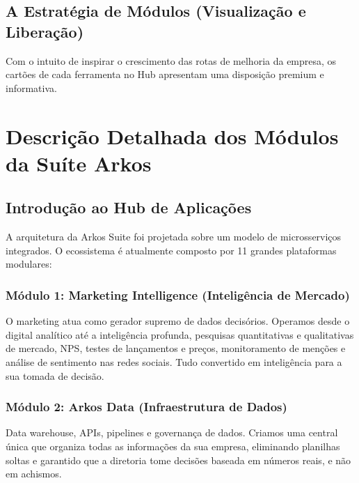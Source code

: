 \documentclass[12pt,a4paper,oneside]{report}
\begin{document}
\section{A Estratégia de Módulos (Visualização e Liberação)}
Com o intuito de inspirar o crescimento das rotas de melhoria da empresa, os cartões de cada ferramenta no Hub apresentam uma disposição premium e informativa.

\pagebreak

\chapter{Descrição Detalhada dos Módulos da Suíte Arkos}

\section{Introdução ao Hub de Aplicações}
A arquitetura da Arkos Suite foi projetada sobre um modelo de microsserviços integrados. O ecossistema é atualmente composto por 11 grandes plataformas modulares:

\subsection{Módulo 1: Marketing Intelligence (Inteligência de Mercado)}
O marketing atua como gerador supremo de dados decisórios. Operamos desde o digital analítico até a inteligência profunda, pesquisas quantitativas e qualitativas de mercado, NPS, testes de lançamentos e preços, monitoramento de menções e análise de sentimento nas redes sociais. Tudo convertido em inteligência para a sua tomada de decisão.

\subsection{Módulo 2: Arkos Data (Infraestrutura de Dados)}
Data warehouse, APIs, pipelines e governança de dados. Criamos uma central única que organiza todas as informações da sua empresa, eliminando planilhas soltas e garantido que a diretoria tome decisões baseada em números reais, e não em achismos.
\end{document}
